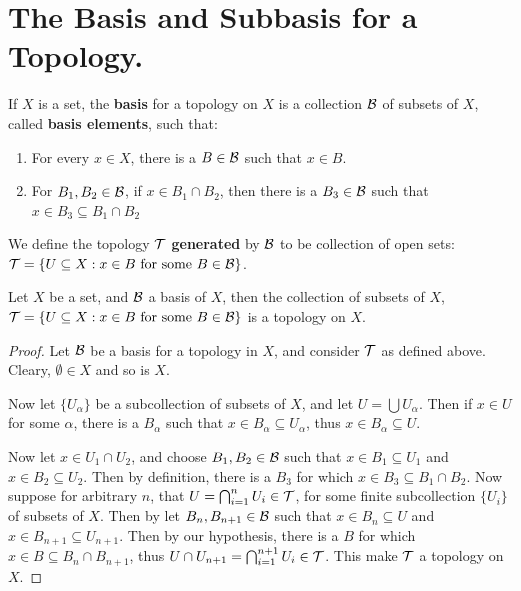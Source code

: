 
\section{The Basis and Subbasis for a Topology.}

\begin{definition}
    If $X$ is a set, the \textbf{basis} for a topology on $X$ is a collection $\mathcal{B}$ of 
    subsets of  $X$, called \textbf{basis elements}, such that:
        \begin{enumerate}[label=(\arabic*)]
            \item For every $x \in X$, there is a  $B \in \mathcal{B}$ such that $x \in B$.

            \item For $B_1,B_2 \in \mathcal{B}$, if $x \in B_1 \cap B_2$, then there is a $B_3 \in \mathcal{B}$ 
                such that $x \in B_3 \subseteq B_1 \cap B_2$
        \end{enumerate}
We define the topology $\mathcal{T}$ \textbf{generated} by $\mathcal{B}$ to be collection of open sets: 
$\mathcal{T}=\{U \subseteq X: x \in B \text{ for some } B \in \mathcal{B}\}$.
\end{definition}

\begin{theorem}\label{1.2.1}
    Let $X$ be a set, and  $\mathcal{B}$ a basis of  $X$, then the collection of subsets 
    of  $X$, $\mathcal{T}=\{U \subseteq X: x \in B \text{ for some } B \in \mathcal{B}\}$ is a topology on $X$.
\end{theorem}
\begin{proof}
    Let $\mathcal{B}$ be a basis for a topology in  $X$, and consider  $\mathcal{T}$ as defined 
    above. Cleary, $\emptyset \in X$ and so is  $X$.

    Now let  $\{U_{\alpha}\}$ be a subcollection of subsets of  $X$, and let  $U=\bigcup{U_{\alpha}}$. 
    Then if  $x \in U$ for some  $\alpha$, there is a  $B_{\alpha}$ such that  $x \in B_{\alpha} \subseteq U_{\alpha}$, 
    thus  $x \in B_{\alpha} \subseteq U$.

    Now let  $x \in  U_1 \cap U_2$, and choose $B_1,B_2 \in \mathcal{B}$ such that $x \in B_1 \subseteq U_1$ 
    and $x \in B_2 \subseteq U_2$. Then  by definition, there is a $B_3$ for which $x \in B_3 \subseteq B_1 \cap B_2$.
    Now suppose for arbitrary $n$, that  $U=\bigcap_{i=1}^{n}{U_i} \in \mathcal{T}$, for some finite 
    subcollection  $\{U_i\}$ of subsets of  $X$. Then by let  $B_n, B_{n+1} \in \mathcal{B}$ such that 
    $x \in B_n \subseteq U$ and  $x \in B_{n+1} \subseteq U_{n+1}$. Then by our hypothesis, there is a  $B$ 
for which  $x \in B \subseteq B_n \cap B_{n+1}$, thus  $U \cap U_{n+1}=\bigcap_{i=1}^{n+1}{U_i} \in \mathcal{T}$. 
This make $\mathcal{T}$ a topology on  $X$.
\end{proof}

